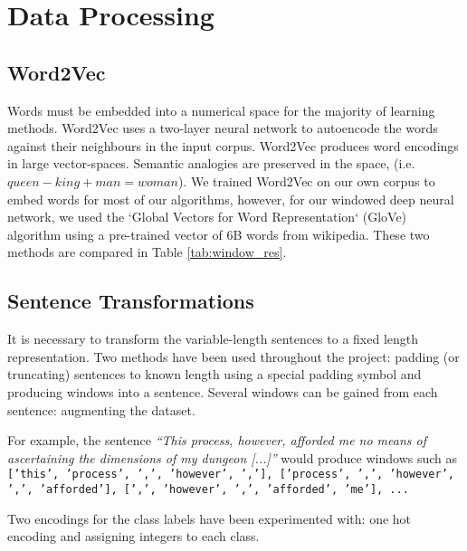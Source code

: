 \section{Data Processing}
\label{sec:data_processing}

  \subsection{Word2Vec}
  \label{sec:word2vec}
  Words must be embedded into a numerical space for the majority of learning methods. Word2Vec uses a two-layer neural network to autoencode the words against their neighbours in the input corpus. Word2Vec produces word encodings in large vector-spaces. Semantic analogies are preserved in the space, (i.e. $queen - king + man = woman$). We trained Word2Vec on our own corpus to embed words for most of our algorithms, however, for our windowed deep neural network, we used the `Global Vectors for Word Representation` (GloVe) algorithm using a pre-trained vector of 6B words from wikipedia. These two methods are compared in Table \ref{tab:window_res}.

  \subsection{Sentence Transformations}
  \label{sec:sentence_transformations}

    It is necessary to transform the variable-length sentences to a fixed length
    representation. Two methods have been used throughout the project: padding
    (or truncating) sentences to known length using a special padding symbol and
    producing windows into a sentence. Several windows can be gained from each
    sentence: augmenting the dataset.

    For example, the sentence \textit{``This process, however, afforded me no
      means of ascertaining the dimensions of my dungeon [...]''} would produce windows
    such as \texttt{['this', 'process', ',', 'however', ','], ['process', ',',
      'however', ',', 'afforded'], [',', 'however', ',', 'afforded', 'me'], ...}

    Two encodings for the class labels have been experimented with: one hot
    encoding and assigning integers to each class.
